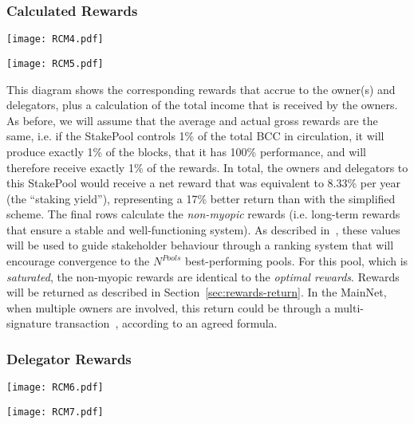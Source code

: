 \documentclass[11pt,a4paper,dvipsnames,twosided,final]{article}
\newcommand{\khcomment}[1]{\todo[color=blue!20]{KH: #1}}
\newcommand{\bcc}{BCC{}}
\newcommand{\bcc}[1]{Bcc}
\begin{document}
\subsubsection*{Calculated Rewards}

\hspace{-0.65in}\begin{minipage}{\textwidth}
  \noindent  \texttt{[image: RCM4.pdf]}

  \vspace{-3in}
  \noindent  \texttt{[image: RCM5.pdf]}

  \vspace{-2.8in}
\end{minipage}

\noindent
This diagram shows the corresponding rewards that accrue to the owner(s) and delegators,
plus a calculation of the total income that is received by the owners.  As before, we will assume that the average
and actual gross rewards are the same, i.e. if the StakePool controls 1\% of the total \bcc{} in
circulation, it will produce exactly 1\% of the blocks, that it has 100\% performance, and will therefore receive exactly 1\% of the rewards.
In total, the
owners and delegators to this StakePool would receive a net reward that was equivalent to 8.33\% per year
(the ``staking yield''), representing a 17\% better return than with the simplified scheme.
The final rows calculate the \emph{non-myopic} rewards (i.e. long-term rewards that ensure
a stable and well-functioning system).  As described in~\cite{delegation_design}, these values will be used to guide stakeholder behaviour
through a ranking system that will encourage convergence to the $N^{\textit{Pools}}$ best-performing pools.
For this pool, which is \emph{saturated}, the non-myopic rewards are identical to the \emph{optimal rewards}.
\khcomment{Is this always the case?}
Rewards will be returned as described in Section~\ref{sec:rewards-return}.  In the MainNet, when multiple
owners are involved, this return could be through a multi-signature transaction~\cite{sophie_multisig}, according to an agreed
formula.

\subsubsection*{Delegator Rewards}

\hspace{-0.65in}\begin{minipage}{\textwidth}
  \texttt{[image: RCM6.pdf]}

\vspace{-3.8in}
\texttt{[image: RCM7.pdf]}

  \vspace{-3in}
\end{minipage}
\end{document}
